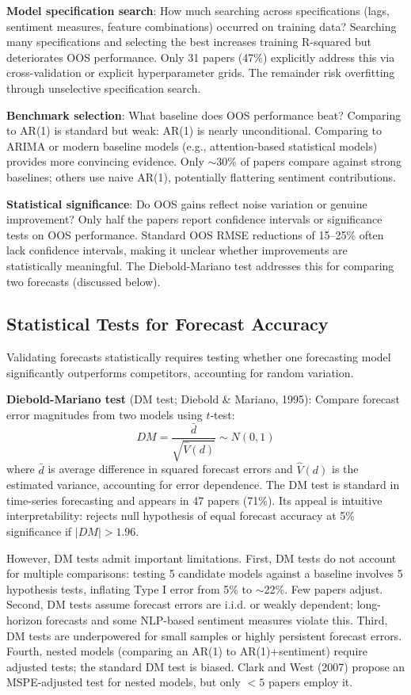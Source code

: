 \textbf{Model specification search}: How much searching across specifications (lags, sentiment measures, feature combinations) occurred on training data? Searching many specifications and selecting the best increases training R-squared but deteriorates OOS performance. Only 31 papers (47\%) explicitly address this via cross-validation or explicit hyperparameter grids. The remainder risk overfitting through unselective specification search.

\textbf{Benchmark selection}: What baseline does OOS performance beat? Comparing to AR(1) is standard but weak: AR(1) is nearly unconditional. Comparing to ARIMA or modern baseline models (e.g., attention-based statistical models) provides more convincing evidence. Only $\sim$30\% of papers compare against strong baselines; others use naive AR(1), potentially flattering sentiment contributions.

\textbf{Statistical significance}: Do OOS gains reflect noise variation or genuine improvement? Only half the papers report confidence intervals or significance tests on OOS performance. Standard OOS RMSE reductions of 15--25\% often lack confidence intervals, making it unclear whether improvements are statistically meaningful. The Diebold-Mariano test addresses this for comparing two forecasts (discussed below).

\subsection{Statistical Tests for Forecast Accuracy}

Validating forecasts statistically requires testing whether one forecasting model significantly outperforms competitors, accounting for random variation.

\textbf{Diebold-Mariano test} (DM test; Diebold \& Mariano, 1995): Compare forecast error magnitudes from two models using $t$-test:
\[
DM = \frac{\bar{d}}{\sqrt{\hat{V}(d)}} \sim N(0,1)
\]
where $\bar{d}$ is average difference in squared forecast errors and $\hat{V}(d)$ is the estimated variance, accounting for error dependence. The DM test is standard in time-series forecasting and appears in 47 papers (71\%). Its appeal is intuitive interpretability: rejects null hypothesis of equal forecast accuracy at 5\% significance if $|DM| > 1.96$. 

However, DM tests admit important limitations. First, DM tests do not account for multiple comparisons: testing 5 candidate models against a baseline involves 5 hypothesis tests, inflating Type I error from 5\% to $\sim$22\%. Few papers adjust. Second, DM tests assume forecast errors are i.i.d. or weakly dependent; long-horizon forecasts and some NLP-based sentiment measures violate this. Third, DM tests are underpowered for small samples or highly persistent forecast errors. Fourth, nested models (comparing an AR(1) to AR(1)+sentiment) require adjusted tests; the standard DM test is biased. Clark and West (2007) propose an MSPE-adjusted test for nested models, but only $<5$ papers employ it.

